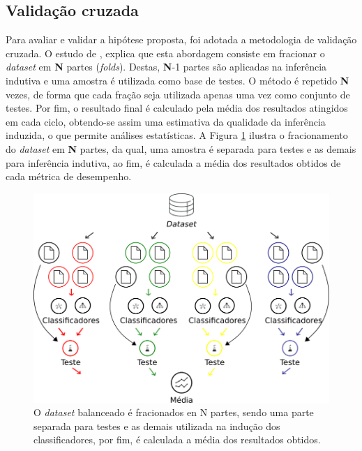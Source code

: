 \subsection{Validação cruzada}
\label{subsection:validacao_cruzada}

Para avaliar e validar a hipótese proposta, foi adotada a metodologia de 
validação cruzada. O estudo de , explica que esta 
abordagem consiste em fracionar o \textit{dataset} em \textbf{N} partes 
(\textit{folds}). Destas, \textbf{N}-1 partes são aplicadas na inferência 
indutiva e uma amostra é utilizada como base de testes. O método é repetido 
\textbf{N} vezes, de forma que cada fração seja utilizada apenas uma vez como 
conjunto de testes. Por fim, o resultado final é calculado pela média dos 
resultados atingidos em cada ciclo, obtendo-se assim uma estimativa da 
qualidade da inferência induzida, o que permite análises estatísticas. A Figura 
\ref{figure:metodologia_4} ilustra o fracionamento do \textit{dataset} em 
\textbf{N} partes, da qual, uma amostra é separada para testes e as demais para 
inferência indutiva, ao fim, é calculada a média dos resultados obtidos de cada 
métrica de desempenho. 

\begin{figure}[H]
\begin{center}
    \includegraphics[scale=0.50]{images/metodologia_4.png}
\end{center}
\caption{O \textit{dataset} balanceado é fracionados en N partes, sendo uma 
parte separada para testes e as demais utilizada na indução dos classificadores, 
por fim, é calculada a média dos resultados obtidos.}
\label{figure:metodologia_4}
\end{figure}